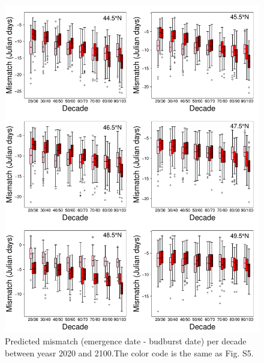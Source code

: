 \documentclass[12 pt]{article}
\begin{document}
\begin{figure}[ht]
\begin{center}
\renewcommand{\thefigure}{S\arabic{figure}}
\includegraphics[width = 14 cm, keepaspectratio]{Mismatch_Per_Decade}
\caption{\doublespacing Predicted mismatch (emergence date - budburst date) per decade between yeasr 2020 and 2100.The color code is the same as Fig. S5.}
\end{center}
\end{figure}

\clearpage

\end{document}

